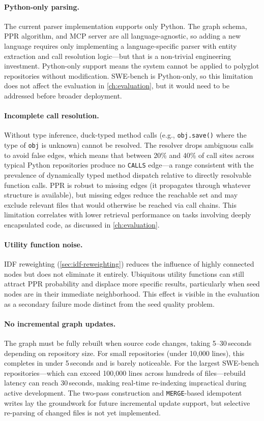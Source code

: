 \paragraph{Python-only parsing.} The current parser implementation supports only Python. The graph schema, PPR algorithm, and MCP server are all language-agnostic, so adding a new language requires only implementing a language-specific parser with entity extraction and call resolution logic---but that is a non-trivial engineering investment. Python-only support means the system cannot be applied to polyglot repositories without modification. SWE-bench is Python-only, so this limitation does not affect the evaluation in \cref{ch:evaluation}, but it would need to be addressed before broader deployment.

\paragraph{Incomplete call resolution.} Without type inference, duck-typed method calls (e.g., \texttt{obj.save()} where the type of \texttt{obj} is unknown) cannot be resolved. The resolver drops ambiguous calls to avoid false edges, which means that between 20\% and 40\% of call sites across typical Python repositories produce no \texttt{CALLS} edge---a range consistent with the prevalence of dynamically typed method dispatch relative to directly resolvable function calls. PPR is robust to missing edges (it propagates through whatever structure is available), but missing edges reduce the reachable set and may exclude relevant files that would otherwise be reached via call chains. This limitation correlates with lower retrieval performance on tasks involving deeply encapsulated code, as discussed in \cref{ch:evaluation}.

\paragraph{Utility function noise.} IDF reweighting (\cref{sec:idf-reweighting}) reduces the influence of highly connected nodes but does not eliminate it entirely. Ubiquitous utility functions can still attract PPR probability and displace more specific results, particularly when seed nodes are in their immediate neighborhood. This effect is visible in the evaluation as a secondary failure mode distinct from the seed quality problem.

\paragraph{No incremental graph updates.} The graph must be fully rebuilt when source code changes, taking 5--30\,seconds depending on repository size. For small repositories (under 10,000 lines), this completes in under 5\,seconds and is barely noticeable. For the largest SWE-bench repositories---which can exceed 100,000 lines across hundreds of files---rebuild latency can reach 30\,seconds, making real-time re-indexing impractical during active development. The two-pass construction and \texttt{MERGE}-based idempotent writes lay the groundwork for future incremental update support, but selective re-parsing of changed files is not yet implemented.


